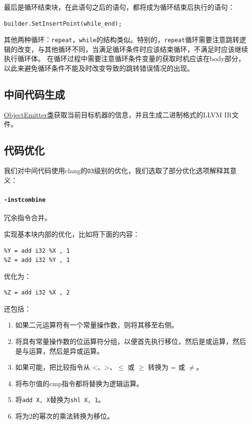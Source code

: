 \documentclass[lang=cn,11pt,a4paper,cite=authornum]{paper}
\begin{document}
最后是循环结束块，在此语句之后的语句，都将成为循环结束后执行的语句：

\begin{code}
    \begin{verbatim}
builder.SetInsertPoint(while_end);
\end{verbatim}
\end{code}

其他两种循环：\texttt{repeat}，\texttt{while}的结构类似。特别的，\texttt{repeat}循环需要注意跳转逻辑的改变，与其他循环不同，当满足循环条件时应该结束循环，不满足时应该继续执行循环体。
在循环过程中需要注意循环条件变量的获取时机应该在body部分，以此来避免循环条件不能及时改变导致的跳转错误情况的出现。

\subsection{中间代码生成}

\href{run:./html/class_pascal_s_1_1_object_emitter.html}{ObjectEmitter类}获取当前目标机器的信息，并且生成二进制格式的LLVM IR文件。

\subsection{代码优化}

我们对中间代码使用clang的\texttt{O3}级别的优化，我们选取了部分优化选项解释其意义：

\paragraph{\texttt{-instcombine}} 冗余指令合并。

实现基本块内部的优化，比如将下面的内容：

\begin{code}
    \begin{verbatim}
%Y = add i32 %X , 1
%Z = add i32 %Y , 1
\end{verbatim}
\end{code}

优化为：

\begin{code}
    \begin{verbatim}
%Z = add i32 %X , 2
\end{verbatim}
\end{code}

还包括：

\begin{enumerate}
    \item 如果二元运算符有一个常量操作数，则将其移至右侧。
    \item 将具有常量操作数的位运算符分组，以便首先执行移位，然后是或运算，然后是与运算，然后是异或运算。
    \item 如果可能，把比较指令从 <、>、$\leq$ 或 $\geq$ 转换为 = 或 $\not=$。
    \item 将布尔值的cmp指令都将替换为逻辑运算。
    \item 将\texttt{add X, X}替换为\texttt{shl X, 1}。
    \item 将为2的幂次的乘法转换为移位。
\end{enumerate}
\end{document}
